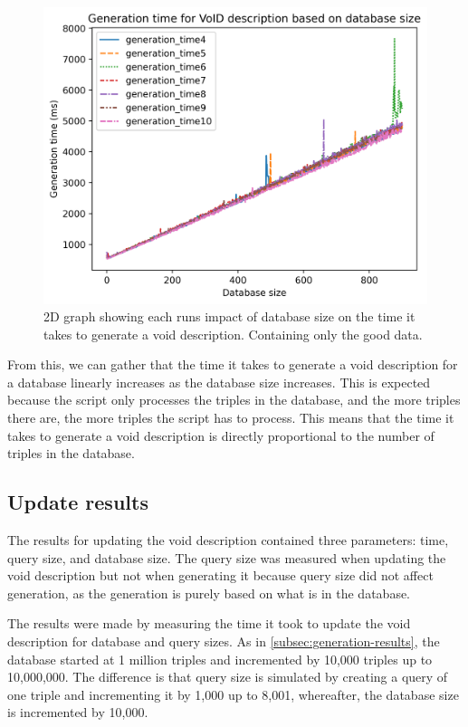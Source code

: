 \begin{figure}[htb!]
    \centering
    \includegraphics[width=0.8\columnwidth]{figures/generation-results-graph-all-good.png}
    \caption{2D graph showing each runs impact of database size on the time it takes to generate a \gls{void} description. Containing only the good data.}
    \label{fig:generate-dbsize-10-runs-good}
\end{figure}

From this, we can gather that the time it takes to generate a \gls{void} description for a database linearly increases as the database size increases. This is expected because the script only processes the triples in the database, and the more triples there are, the more triples the script has to process. This means that the time it takes to generate a \gls{void} description is directly proportional to the number of triples in the database.

\subsection{Update results}\label{subsec:update-results}
The results for updating the \gls{void} description contained three parameters: time, query size, and database size. The query size was measured when updating the \gls{void} description but not when generating it because query size did not affect generation, as the generation is purely based on what is in the database.

The results were made by measuring the time it took to update the \gls{void} description for database and query sizes. As in \autoref{subsec:generation-results}, the database started at 1 million triples and incremented by 10,000 triples up to 10,000,000. The difference is that query size is simulated by creating a query of one triple and incrementing it by 1,000 up to 8,001, whereafter, the database size is incremented by 10,000.

